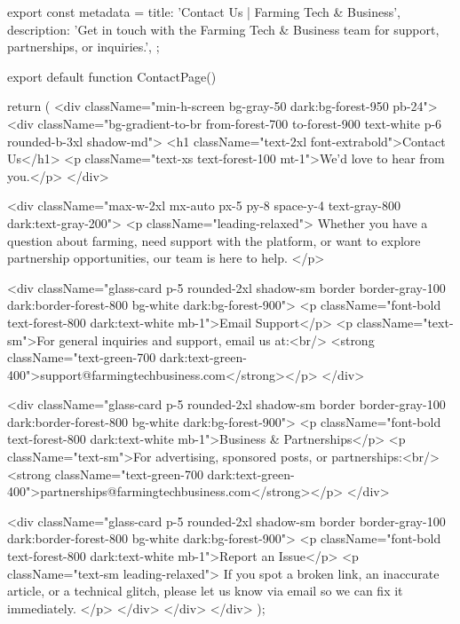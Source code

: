 export const metadata = {
  title: 'Contact Us | Farming Tech & Business',
  description: 'Get in touch with the Farming Tech & Business team for support, partnerships, or inquiries.',
};

export default function ContactPage() {
  return (
    <div className="min-h-screen bg-gray-50 dark:bg-forest-950 pb-24">
      <div className="bg-gradient-to-br from-forest-700 to-forest-900 text-white p-6 rounded-b-3xl shadow-md">
        <h1 className="text-2xl font-extrabold">Contact Us</h1>
        <p className="text-xs text-forest-100 mt-1">We'd love to hear from you.</p>
      </div>

      <div className="max-w-2xl mx-auto px-5 py-8 space-y-4 text-gray-800 dark:text-gray-200">
        <p className="leading-relaxed">
          Whether you have a question about farming, need support with the platform, or want to explore partnership opportunities, our team is here to help.
        </p>

        <div className="glass-card p-5 rounded-2xl shadow-sm border border-gray-100 dark:border-forest-800 bg-white dark:bg-forest-900">
          <p className="font-bold text-forest-800 dark:text-white mb-1">Email Support</p>
          <p className="text-sm">For general inquiries and support, email us at:<br/>
          <strong className="text-green-700 dark:text-green-400">support@farmingtechbusiness.com</strong></p>
        </div>

        <div className="glass-card p-5 rounded-2xl shadow-sm border border-gray-100 dark:border-forest-800 bg-white dark:bg-forest-900">
          <p className="font-bold text-forest-800 dark:text-white mb-1">Business & Partnerships</p>
          <p className="text-sm">For advertising, sponsored posts, or partnerships:<br/>
          <strong className="text-green-700 dark:text-green-400">partnerships@farmingtechbusiness.com</strong></p>
        </div>

        <div className="glass-card p-5 rounded-2xl shadow-sm border border-gray-100 dark:border-forest-800 bg-white dark:bg-forest-900">
          <p className="font-bold text-forest-800 dark:text-white mb-1">Report an Issue</p>
          <p className="text-sm leading-relaxed">
            If you spot a broken link, an inaccurate article, or a technical glitch, please let us know via email so we can fix it immediately.
          </p>
        </div>
      </div>
    </div>
  );
}